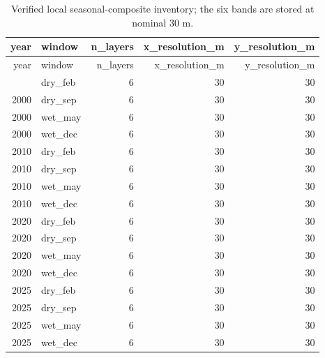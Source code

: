 \documentclass[
]{article}
\newenvironment{Shaded}{\begin{snugshade}}{\end{snugshade}}
\newcommand{\AttributeTok}[1]{\textcolor[rgb]{0.13,0.29,0.53}{#1}}
\newcommand{\ConstantTok}[1]{\textcolor[rgb]{0.56,0.35,0.01}{#1}}
\newcommand{\DecValTok}[1]{\textcolor[rgb]{0.00,0.00,0.81}{#1}}
\newcommand{\FloatTok}[1]{\textcolor[rgb]{0.00,0.00,0.81}{#1}}
\newcommand{\FunctionTok}[1]{\textcolor[rgb]{0.13,0.29,0.53}{\textbf{#1}}}
\newcommand{\NormalTok}[1]{#1}
\newcommand{\SpecialCharTok}[1]{\textcolor[rgb]{0.81,0.36,0.00}{\textbf{#1}}}
\newcommand{\StringTok}[1]{\textcolor[rgb]{0.31,0.60,0.02}{#1}}
\begin{document}
\begin{Shaded}
\end{Shaded}

\begin{longtable}[]{@{}rlrrr@{}}
\caption{Verified local seasonal-composite inventory; the six bands are
stored at nominal 30 m.}\tabularnewline
\toprule\noalign{}
year & window & n\_layers & x\_resolution\_m & y\_resolution\_m \\
\midrule\noalign{}
\endfirsthead
\toprule\noalign{}
year & window & n\_layers & x\_resolution\_m & y\_resolution\_m \\
\midrule\noalign{}
\endhead
\bottomrule\noalign{}
\endlastfoot
2000 & dry\_feb & 6 & 30 & 30 \\
2000 & dry\_sep & 6 & 30 & 30 \\
2000 & wet\_may & 6 & 30 & 30 \\
2000 & wet\_dec & 6 & 30 & 30 \\
2010 & dry\_feb & 6 & 30 & 30 \\
2010 & dry\_sep & 6 & 30 & 30 \\
2010 & wet\_may & 6 & 30 & 30 \\
2010 & wet\_dec & 6 & 30 & 30 \\
2020 & dry\_feb & 6 & 30 & 30 \\
2020 & dry\_sep & 6 & 30 & 30 \\
2020 & wet\_may & 6 & 30 & 30 \\
2020 & wet\_dec & 6 & 30 & 30 \\
2025 & dry\_feb & 6 & 30 & 30 \\
2025 & dry\_sep & 6 & 30 & 30 \\
2025 & wet\_may & 6 & 30 & 30 \\
2025 & wet\_dec & 6 & 30 & 30 \\
\end{longtable}
\end{document}
